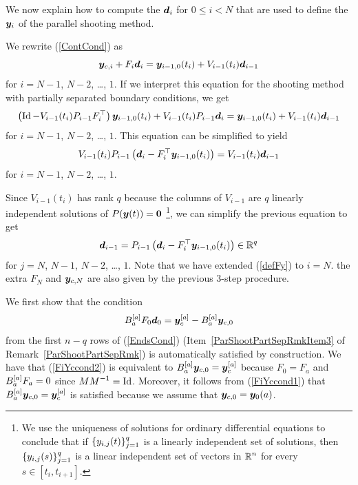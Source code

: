 We now explain how to compute the $\bm{d}_i$ for $0\leq i < N$
that are used to define the $\bm{y}_i$ of the parallel shooting method.

We rewrite (\ref{ContCond}) as 
\[
  \bm{y}_{c,i} + F_i\bm{d}_i = \bm{y}_{i-1,0}(t_i) + V_{i-1}(t_i)
\bm{d}_{i-1}
\]
for $i=N-1$, $N-2$, \ldots, $1$.  If we interpret this equation for
the shooting method with partially separated boundary conditions, we get
\[
\left(\operatorname{Id} - V_{i-1}(t_i)P_{i-1}F_i^\top \right)\bm{y}_{i-1,0}(t_i) +
V_{i-1}(t_i)P_{i-1}\bm{d}_i = \bm{y}_{i-1,0}(t_i) + V_{i-1}(t_i)\bm{d}_{i-1}
\]
for $i=N-1$, $N-2$, \ldots, $1$.  This equation can be simplified to
yield
\[
V_{i-1}(t_i)P_{i-1} \left( \bm{d}_i - F_i^\top\bm{y}_{i-1,0}(t_i)
\right) = V_{i-1}(t_i)\bm{d}_{i-1}
\]
for $i=N-1$, $N-2$, \ldots, $1$.

Since $V_{i-1}(t_i)$ has rank $q$ because the columns of $V_{i-1}$
are $q$ linearly independent solutions of $P(\bm{y}(t)) = \bm{0}$
\footnote{We use the uniqueness of solutions for ordinary differential
equations to conclude that if $\displaystyle \{y_{i,j}(t)\}_{j=1}^q$
is a linearly independent set of solutions, then
$\displaystyle \{y_{i,j}(s)\}_{j=1}^q$ is a linear independent set of
vectors in $\displaystyle \mathbb{R}^n$ for every $s\in [t_i,t_{i+1}]$.},
we can simplify the previous equation to get
\begin{equation} \label{defFy}
\bm{d}_{i-1} = P_{i-1} \left( \bm{d}_i - F_i^\top\bm{y}_{i-1,0}(t_i)
\right) \in \mathbb{R}^q
\end{equation}
for $j=N$, $N-1$, $N-2$, \ldots, $1$.  Note that we have extended
(\ref{defFy}) to $i = N$. the extra $F_N$ and $\bm{y}_{c,N}$
are also given by the previous $3$-step procedure.

We first show that the condition
\begin{equation}\label{FiYccond2}
  B_a^{[a]} F_0 \bm{d}_0 = \bm{y}_c^{[a]} - B_a^{[a]} \bm{y}_{c,0} 
\end{equation}
from the first $n-q$ rows of (\ref{EndsCond})
(Item~\ref{ParShootPartSepRmkItem3} of
Remark~\ref{ParShootPartSepRmk}) is automatically 
satisfied by construction.  We have that (\ref{FiYccond2}) is equivalent
to $\displaystyle B_a^{[a]} \bm{y}_{c,0} = \bm{y}_c^{[a]}$ because
$F_0 = F_a$ and $\displaystyle B_a^{[a]} F_a = 0$ since
$\displaystyle M M^{-1} = \operatorname{Id}$.  Moreover, it follows from
(\ref{FiYccond1}) that
$\displaystyle B_a^{[a]} \bm{y}_{c,0} = \bm{y}_c^{[a]}$ is
satisfied because we assume that $\bm{y}_{c,0} = \bm{y}_0(a)$.

